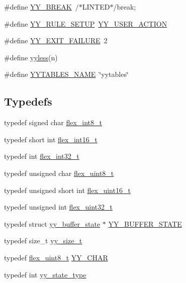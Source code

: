 \begin{DoxyCompactItemize}
\item 
\#define \hyperlink{_genesys_09_09-scanner_8cpp_a3cc40a460ad7df816678bcc05241e84c}{Y\-Y\-\_\-\-B\-R\-E\-A\-K}~/$\ast$L\-I\-N\-T\-E\-D$\ast$/break;
\item 
\#define \hyperlink{_genesys_09_09-scanner_8cpp_a690504b662e4281515bf12722df178ba}{Y\-Y\-\_\-\-R\-U\-L\-E\-\_\-\-S\-E\-T\-U\-P}~\hyperlink{_genesys_09_09-scanner_8cpp_a6198b2fcf96178b24ad4efff2a3debb0}{Y\-Y\-\_\-\-U\-S\-E\-R\-\_\-\-A\-C\-T\-I\-O\-N}
\item 
\#define \hyperlink{_genesys_09_09-scanner_8cpp_ae93e67b85c44f6bd31ead14a552a35c8}{Y\-Y\-\_\-\-E\-X\-I\-T\-\_\-\-F\-A\-I\-L\-U\-R\-E}~2
\item 
\#define \hyperlink{_genesys_09_09-scanner_8cpp_ae65cb72d09db0abdc4b8e8c4d533ab14}{yyless}(n)
\item 
\#define \hyperlink{_genesys_09_09-scanner_8cpp_a828cc83270f8f5bb1688e14dd4e28128}{Y\-Y\-T\-A\-B\-L\-E\-S\-\_\-\-N\-A\-M\-E}~\char`\"{}yytables\char`\"{}
\end{DoxyCompactItemize}
\subsection*{Typedefs}
\begin{DoxyCompactItemize}
\item 
typedef signed char \hyperlink{_genesys_09_09-scanner_8cpp_a7b0840dff4a2ef1702118aa12264b2a7}{flex\-\_\-int8\-\_\-t}
\item 
typedef short int \hyperlink{_genesys_09_09-scanner_8cpp_a2e73b2c75126814585525fb2e9d51159}{flex\-\_\-int16\-\_\-t}
\item 
typedef int \hyperlink{_genesys_09_09-scanner_8cpp_a838ce943cf44ef7769480714fc6c3ba9}{flex\-\_\-int32\-\_\-t}
\item 
typedef unsigned char \hyperlink{_genesys_09_09-scanner_8cpp_a0fac5ea484f64e75dbe6eba4aa61750c}{flex\-\_\-uint8\-\_\-t}
\item 
typedef unsigned short int \hyperlink{_genesys_09_09-scanner_8cpp_ac50cdb9eefbef83a1cec89e3a7f6e1d2}{flex\-\_\-uint16\-\_\-t}
\item 
typedef unsigned int \hyperlink{_genesys_09_09-scanner_8cpp_a36869712de12820c73aae736762e8e88}{flex\-\_\-uint32\-\_\-t}
\item 
typedef struct \hyperlink{structyy__buffer__state}{yy\-\_\-buffer\-\_\-state} $\ast$ \hyperlink{_genesys_09_09-scanner_8cpp_a4e5bd2d129903df83f3d13effaf8f3e4}{Y\-Y\-\_\-\-B\-U\-F\-F\-E\-R\-\_\-\-S\-T\-A\-T\-E}
\item 
typedef size\-\_\-t \hyperlink{_genesys_09_09-scanner_8cpp_ad557845057f187eec4be07e2717d2afa}{yy\-\_\-size\-\_\-t}
\item 
typedef \hyperlink{_genesys_09_09-scanner_8cpp_a0fac5ea484f64e75dbe6eba4aa61750c}{flex\-\_\-uint8\-\_\-t} \hyperlink{_genesys_09_09-scanner_8cpp_acc1e625a829554ffed5e4307d4a5f6b7}{Y\-Y\-\_\-\-C\-H\-A\-R}
\item 
typedef int \hyperlink{_genesys_09_09-scanner_8cpp_a9ba7c416f135b0f0c1f4addded4616b5}{yy\-\_\-state\-\_\-type}
\end{DoxyCompactItemize}
